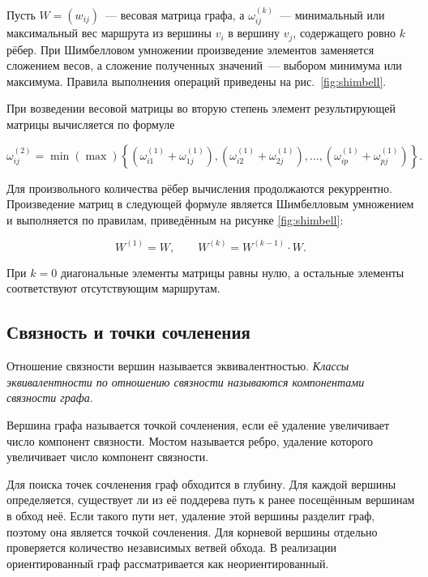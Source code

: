 Пусть $W=(w_{ij})$~--- весовая матрица графа, а $\omega_{ij}^{(k)}$~--- минимальный или максимальный вес маршрута из вершины $v_i$ в вершину $v_j$, содержащего ровно $k$ рёбер. При Шимбелловом умножении произведение элементов заменяется сложением весов, а сложение полученных значений~--- выбором минимума или максимума. Правила выполнения операций приведены на рис.~\ref{fig:shimbell}.


При возведении весовой матрицы во вторую степень элемент результирующей матрицы вычисляется по формуле

\[
\omega_{ij}^{(2)} = \min(\max)\left\{
    \left(\omega_{i1}^{(1)} + \omega_{1j}^{(1)}\right),
    \left(\omega_{i2}^{(1)} + \omega_{2j}^{(1)}\right),
    \ldots,
    \left(\omega_{ip}^{(1)} + \omega_{pj}^{(1)}\right)
\right\}.
\]

Для произвольного количества рёбер вычисления продолжаются рекуррентно. Произведение матриц в следующей формуле является Шимбелловым умножением и выполняется по правилам, приведённым на рисунке \ref{fig:shimbell}:

\[
W^{(1)}=W,
\qquad
W^{(k)}=W^{(k-1)} \cdot W.
\]

При $k=0$ диагональные элементы матрицы равны нулю, а остальные элементы соответствуют отсутствующим маршрутам.

\subsection{Связность и точки сочленения}

Отношение связности вершин называется эквивалентностью. \textit{Классы эквивалентности по отношению связности называются компонентами связности графа}.

Вершина графа называется точкой сочленения, если её удаление увеличивает число компонент связности. Мостом называется ребро, удаление которого увеличивает число компонент связности.

Для поиска точек сочленения граф обходится в глубину. Для каждой вершины определяется, существует ли из её поддерева путь к ранее посещённым вершинам в обход неё. Если такого пути нет, удаление этой вершины разделит граф, поэтому она является точкой сочленения. Для корневой вершины отдельно проверяется количество независимых ветвей обхода. В реализации ориентированный граф рассматривается как неориентированный.

